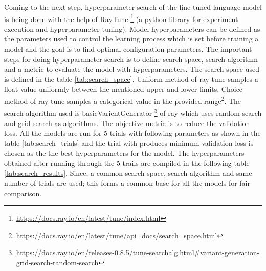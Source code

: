 Coming to the next step, hyperparameter search of the fine-tuned language model is being done with the help of RayTune \footnote{\url{https://docs.ray.io/en/latest/tune/index.html}} (a python library for experiment execution and hyperparameter tuning). Model hyperparameters can be defined as the parameters used to control the learning process which is set before training a model \cite{bergstra2012random} and the goal is to find optimal configuration parameters. The important steps for doing hyperparameter search is to define search space, search algorithm and a metric to evaluate the model with hyperparameters. The search space used is defined in the table \ref{tab:search_space}. Uniform method of ray tune samples a float value uniformly between the mentioned upper and lower limits. Choice method of ray tune samples a categorical value in the provided range\footnote{\url{https://docs.ray.io/en/latest/tune/api_docs/search_space.html}}. The search algorithm used is basicVarientGenerator \footnote{\url{https://docs.ray.io/en/releases-0.8.5/tune-searchalg.html#variant-generation-grid-search-random-search}} of ray which uses random search and grid search as algorithms. The objective metric is to reduce the validation loss. All the models are run for 5 trials with following parameters as shown in the table \ref{tab:search_trials} and the trial with produces minimum validation loss is chosen as the  the best hyperparameters for the model.  The hyperparameters obtained after running through the 5 trails are compiled in the following table \ref{tab:search_results}. Since, a common search space, search algorithm and same number of trials are used; this forms a common base for all the models for fair comparison.

